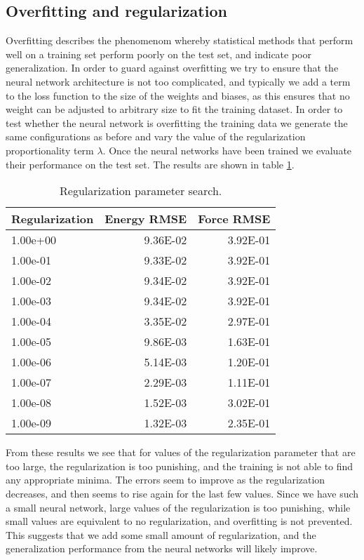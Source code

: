 \subsection{Overfitting and regularization}
Overfitting describes the phenomenom whereby statistical methods
that perform well on a training set perform poorly on the test set,
and indicate poor generalization.
In order to guard against overfitting we try to ensure that the
neural network architecture is not too complicated, and typically
we add a term to the loss function to the size of the weights and biases,
as this ensures that no weight can be adjusted to arbitrary size
to fit the training dataset.
In order to test whether the neural network is overfitting the training
data we generate the same configurations as before and vary
the value of the regularization proportionality term $\lambda$.
Once the neural networks have been trained we evaluate their
performance on the test set. The results are shown in table \ref{table:overfit}.

\begin{table}[H]
\centering
\begin{tabular}{lrr} 
\toprule
Regularization &  Energy RMSE &  Force RMSE \\
\midrule
     1.00e+00 &     9.36E-02 &    3.92E-01 \\
     1.00e-01 &     9.33E-02 &    3.92E-01 \\
     1.00e-02 &     9.34E-02 &    3.92E-01 \\
     1.00e-03 &     9.34E-02 &    3.92E-01 \\
     1.00e-04 &     3.35E-02 &    2.97E-01 \\
     1.00e-05 &     9.86E-03 &    1.63E-01 \\
     1.00e-06 &     5.14E-03 &    1.20E-01 \\
     1.00e-07 &     2.29E-03 &    1.11E-01 \\
     1.00e-08 &     1.52E-03 &    3.02E-01 \\
     1.00e-09 &     1.32E-03 &    2.35E-01 \\
\bottomrule
\end{tabular}
\caption{Regularization parameter search.}
\label{table:overfit}
\end{table}

From these results we see that for values of the regularization parameter
that are too large, the regularization is too punishing,
and the training is not able to find any appropriate minima.
The errors seem to improve as the regularization decreases,
and then seems to rise again for the last few values.
Since we have such a small neural network, large values of the regularization
is too punishing, while small values are equivalent to no regularization,
and overfitting is not prevented. This suggests that we add some small
amount of regularization, and the generalization performance from
the neural networks will likely improve.

